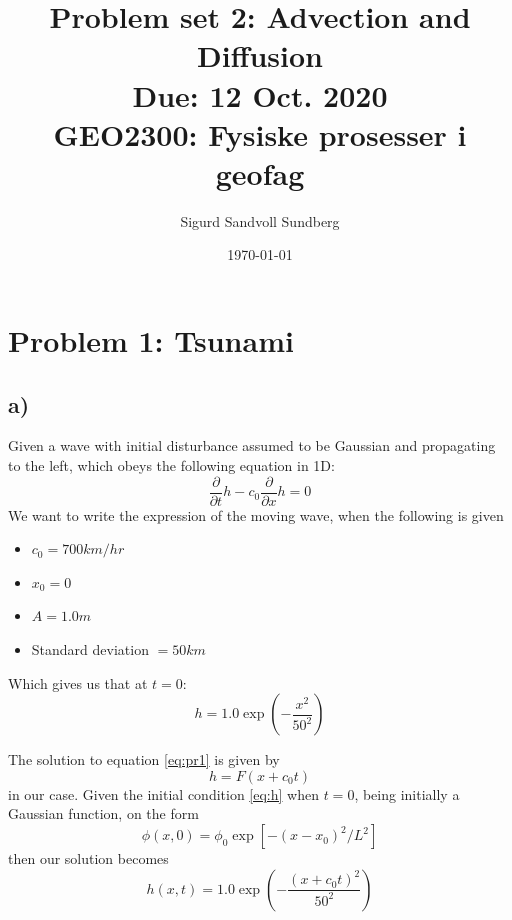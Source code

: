 \documentclass[10pt, a4paper]{amsart}
\title[Problem set 1]{Problem set 2: Advection and Diffusion\\
\normalsize{Due: 12 Oct. 2020} \\
  \hrulefill\small{ GEO2300: Fysiske prosesser i geofag }\hrulefill}
\author[Sundberg]{Sigurd Sandvoll Sundberg}
\date{\today}
\begin{document}
\maketitle

\section{Problem 1: Tsunami}
\subsection{a)}
Given a wave with initial disturbance assumed to be Gaussian and propagating to the left, which obeys the following equation in 1D:
\begin{equation}\label{eq:pr1}
	\frac{\partial }{\partial t} h - c_0 \frac{\partial}{\partial x}h = 0
\end{equation}
We want to write the expression of the moving wave, when the following is given 
\begin{itemize}
	\item $c_0 = 700 km/hr$
	\item $x_0 = 0$
	\item $ A = 1.0m$
	\item Standard deviation $= 50km$
\end{itemize}
Which gives us that at $t = 0$:
\begin{equation}\label{eq:h}
	h = 1.0 \exp(-\frac{x^2}{50^2})
\end{equation}

The solution to equation \ref{eq:pr1} is given by 
\begin{equation}
	h = F(x+c_0t)
\end{equation}
in our case. Given the initial condition \ref{eq:h} when $t = 0$, being initially a Gaussian function, on the form  
\begin{equation}
	\phi(x,0) = \phi_0\exp\left[-(x-x_0)^2/L^2\right]
\end{equation}
then our solution becomes 
\begin{equation}
	h(x,t) = 1.0 \exp\left(-\frac{(x+c_0t)^2}{50^2}\right)
\end{equation}
\end{document}
